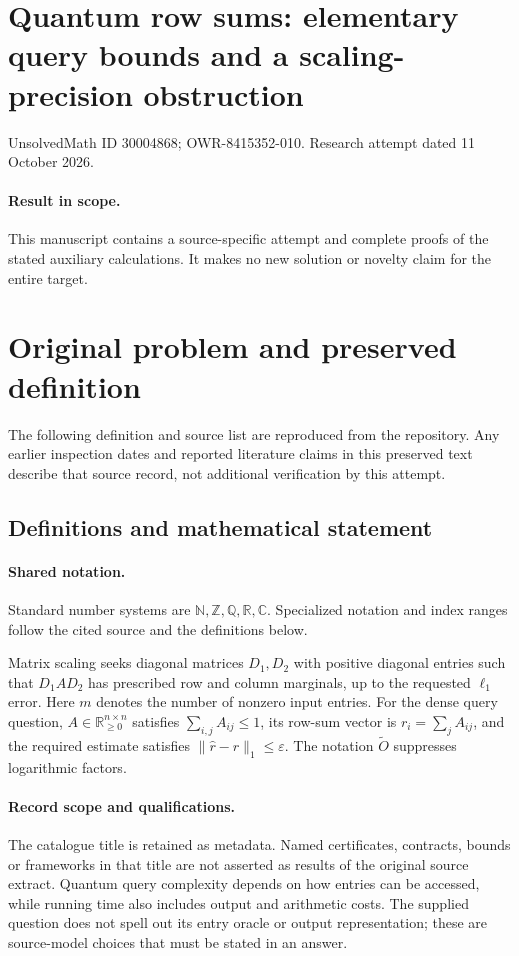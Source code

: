 \documentclass[11pt]{article}
\begin{document}
\section*{Quantum row sums: elementary query bounds and a scaling-precision obstruction}
\noindent UnsolvedMath ID 30004868; OWR-8415352-010. Research attempt dated 11 October 2026.
\paragraph{Result in scope.}This manuscript contains a source-specific attempt and complete proofs of the stated auxiliary calculations. It makes no new solution or novelty claim for the entire target.
\section{Original problem and preserved definition}
The following definition and source list are reproduced from the repository. Any earlier inspection dates and reported literature claims in this preserved text describe that source record, not additional verification by this attempt.
\subsection{Definitions and mathematical statement}

\paragraph{Shared notation.}Standard number systems are $\mathbb N,\mathbb Z,\mathbb Q,\mathbb R,\mathbb C$. Specialized notation and index ranges follow the cited source and the definitions below.


Matrix scaling seeks diagonal matrices $D_1,D_2$ with positive diagonal entries such that $D_1AD_2$ has prescribed row and column marginals, up to the requested $\ell_1$ error. Here $m$ denotes the number of nonzero input entries. For the dense query question, $A\in\mathbb R_{\geq0}^{n\times n}$ satisfies $\sum_{i,j}A_{ij}\leq1$, its row-sum vector is $r_i=\sum_jA_{ij}$, and the required estimate satisfies $\|\widehat r-r\|_1\leq\varepsilon$. The notation $\widetilde O$ suppresses logarithmic factors.
\paragraph{Record scope and qualifications.}
The catalogue title is retained as metadata. Named certificates, contracts, bounds or frameworks in that title are not asserted as results of the original source extract.
Quantum query complexity depends on how entries can be accessed, while running time also includes output and arithmetic costs. The supplied question does not spell out its entry oracle or output representation; these are source-model choices that must be stated in an answer.
\end{document}
